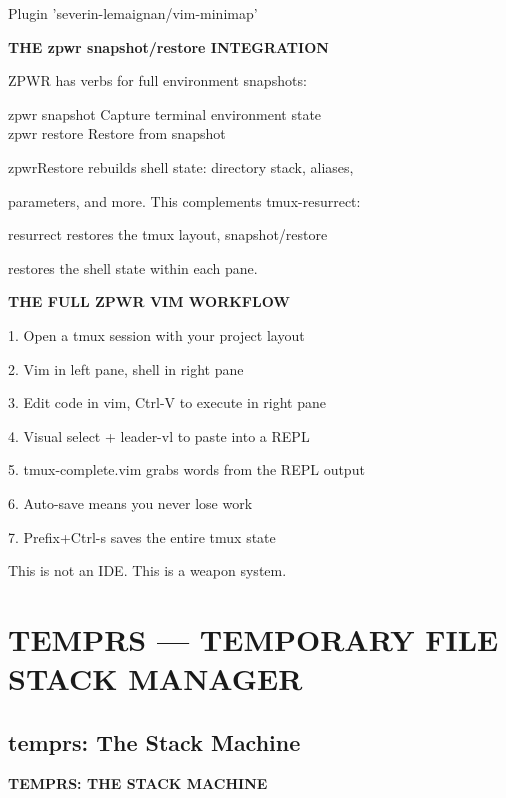 \documentclass[11pt,a4paper,twoside]{book}
\begin{document}
Plugin 'severin-lemaignan/vim-minimap'


\vspace{12pt}
{\bfseries\color{neonyellow} THE zpwr snapshot/restore INTEGRATION}\vspace{4pt}

ZPWR has verbs for full environment snapshots:

\begin{codebox}
zpwr snapshot    Capture terminal environment state\\
zpwr restore     Restore from snapshot\\
\end{codebox}

zpwrRestore rebuilds shell state: directory stack, aliases,

parameters, and more. This complements tmux-resurrect:

resurrect restores the tmux layout, snapshot/restore

restores the shell state within each pane.


\vspace{12pt}
{\bfseries\color{neonyellow} THE FULL ZPWR VIM WORKFLOW}\vspace{4pt}

1. Open a tmux session with your project layout

2. Vim in left pane, shell in right pane

3. Edit code in vim, Ctrl-V to execute in right pane

4. Visual select + leader-vl to paste into a REPL

5. tmux-complete.vim grabs words from the REPL output

6. Auto-save means you never lose work

7. Prefix+Ctrl-s saves the entire tmux state

This is not an IDE. This is a weapon system.


\vspace{16pt}


\chapter{TEMPRS — TEMPORARY FILE STACK MANAGER}

\section{temprs: The Stack Machine}


\vspace{10pt}
{\large\bfseries\color{neoncyan} TEMPRS: THE STACK MACHINE}\vspace{6pt}
\end{document}
